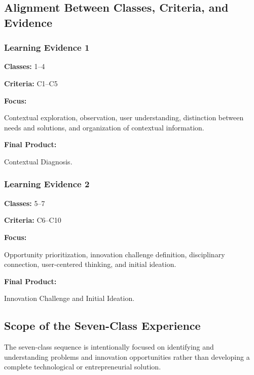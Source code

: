 \documentclass[12pt,a4paper]{article}
\begin{document}
	
	\subsection{Alignment Between Classes, Criteria, and Evidence}
	
	\subsubsection*{Learning Evidence 1}
	
	\textbf{Classes:} 1--4
	
	\textbf{Criteria:} C1--C5
	
	\textbf{Focus:}
	
	Contextual exploration, observation, user understanding, distinction between needs and solutions, and organization of contextual information.
	
	\textbf{Final Product:}
	
	Contextual Diagnosis.
	
	\subsubsection*{Learning Evidence 2}
	
	\textbf{Classes:} 5--7
	
	\textbf{Criteria:} C6--C10
	
	\textbf{Focus:}
	
	Opportunity prioritization, innovation challenge definition, disciplinary connection, user-centered thinking, and initial ideation.
	
	\textbf{Final Product:}
	
	Innovation Challenge and Initial Ideation.
	
	
	\subsection{Scope of the Seven-Class Experience}
	
	The seven-class sequence is intentionally focused on identifying and understanding problems and innovation opportunities rather than developing a complete technological or entrepreneurial solution.
	
\end{document}
